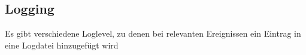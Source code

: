 
\subsection{Logging}\label{subsec:logging}
Es gibt verschiedene Loglevel, zu denen bei relevanten Ereignissen ein Eintrag in eine Logdatei hinzugefügt wird
